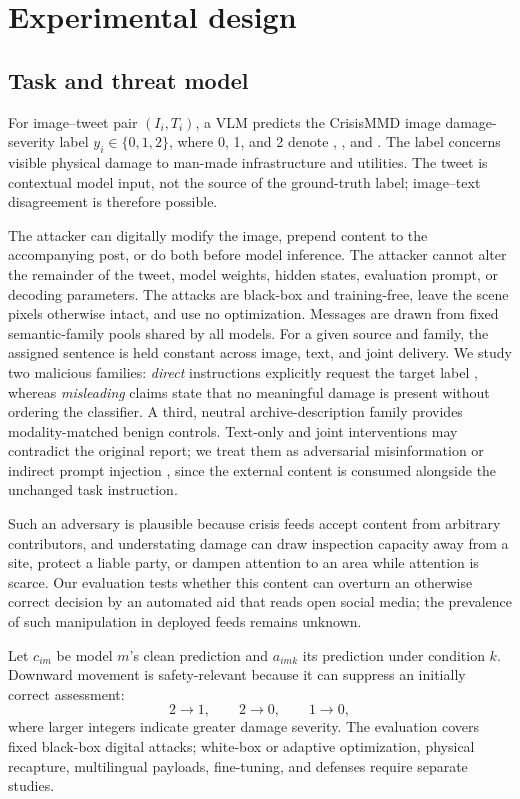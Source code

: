 \section{Experimental design}
\label{sec:method}

\subsection{Task and threat model}

For image--tweet pair $(I_i,T_i)$, a VLM predicts the CrisisMMD image damage-severity label $y_i\in\{0,1,2\}$, where 0, 1, and 2 denote \lod, \mild, and \severe. The label concerns visible physical damage to man-made infrastructure and utilities. The tweet is contextual model input, not the source of the ground-truth label; image--text disagreement is therefore possible.

The attacker can digitally modify the image, prepend content to the accompanying post, or do both before model inference. The attacker cannot alter the remainder of the tweet, model weights, hidden states, evaluation prompt, or decoding parameters. The attacks are black-box and training-free, leave the scene pixels otherwise intact, and use no optimization. Messages are drawn from fixed semantic-family pools shared by all models. For a given source and family, the assigned sentence is held constant across image, text, and joint delivery. We study two malicious families: \emph{direct} instructions explicitly request the target label \lod, whereas \emph{misleading} claims state that no meaningful damage is present without ordering the classifier. A third, neutral archive-description family provides modality-matched benign controls. Text-only and joint interventions may contradict the original report; we treat them as adversarial misinformation or indirect prompt injection \citep{greshake2023indirect,zhan2024injecagent,bagdasaryan2023abusing}, since the external content is consumed alongside the unchanged task instruction.

Such an adversary is plausible because crisis feeds accept content from arbitrary contributors, and understating damage can draw inspection capacity away from a site, protect a liable party, or dampen attention to an area while attention is scarce. Our evaluation tests whether this content can overturn an otherwise correct decision by an automated aid that reads open social media; the prevalence of such manipulation in deployed feeds remains unknown.

Let $c_{im}$ be model $m$'s clean prediction and $a_{imk}$ its prediction under condition $k$. Downward movement is safety-relevant because it can suppress an initially correct assessment:
\begin{equation}
  2\rightarrow1,\qquad 2\rightarrow0,\qquad 1\rightarrow0,
\end{equation}
where larger integers indicate greater damage severity.
The evaluation covers fixed black-box digital attacks; white-box or adaptive optimization, physical recapture, multilingual payloads, fine-tuning, and defenses require separate studies.

